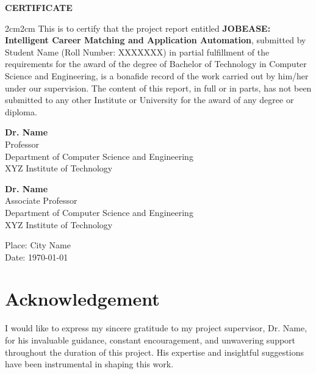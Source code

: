 \documentclass[12pt,a4paper]{report}
\begin{document}
\newpage
\thispagestyle{empty}
\begin{center}
  {\LARGE \textbf{CERTIFICATE}}\\
  \vspace{2cm}
\end{center}
\begin{adjustwidth}{2cm}{2cm}
This is to certify that the project report entitled \textbf{JOBEASE: Intelligent Career Matching and Application Automation}, submitted by Student Name (Roll Number: XXXXXXX) in partial fulfillment of the requirements for the award of the degree of Bachelor of Technology in Computer Science and Engineering, is a bonafide record of the work carried out by him/her under our supervision. The content of this report, in full or in parts, has not been submitted to any other Institute or University for the award of any degree or diploma.
\vspace{4cm}

\begin{minipage}{0.5\textwidth}
  \textbf{Dr. Name}\\
  Professor\\
  Department of Computer Science and Engineering\\
  XYZ Institute of Technology
\end{minipage}
\hfill
\begin{minipage}{0.4\textwidth}
  \textbf{Dr. Name}\\
  Associate Professor\\
  Department of Computer Science and Engineering\\
  XYZ Institute of Technology
\end{minipage}

\vspace{2cm}

\noindent Place: City Name\\
Date: \today
\end{adjustwidth}

\newpage
\chapter*{Acknowledgement}

I would like to express my sincere gratitude to my project supervisor, Dr. Name, for his invaluable guidance, constant encouragement, and unwavering support throughout the duration of this project. His expertise and insightful suggestions have been instrumental in shaping this work.
\end{document}
